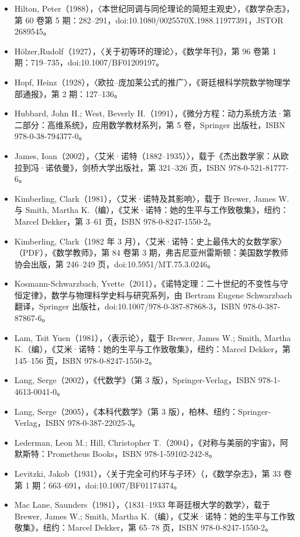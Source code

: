 \begin{itemize}
\item Hilton, Peter（1988），〈本世纪同调与同伦理论的简短主观史〉，《数学杂志》，第 60 卷第 5 期：282–291，doi:10.1080/0025570X.1988.11977391，JSTOR 2689545。
\item Hölzer,Rudolf（1927），〈关于初等环的理论〉，《数学年刊》，第 96 卷第 1 期：719–735，doi:10.1007/BF01209197。
\item Hopf, Heinz（1928），〈欧拉–庞加莱公式的推广〉，《哥廷根科学院数学物理学部通报》，第 2 期：127–136。
\item Hubbard, John H.; West, Beverly H.（1991），《微分方程：动力系统方法·第二部分：高维系统》，应用数学教材系列，第 5 卷，Springer 出版社，ISBN 978-0-38-794377-0。
\item James, Ioan（2002），〈艾米·诺特（1882–1935）〉，载于《杰出数学家：从欧拉到冯·诺依曼》，剑桥大学出版社，第 321–326 页，ISBN 978-0-521-81777-6。
\item Kimberling, Clark（1981），〈艾米·诺特及其影响〉，载于 Brewer, James W. 与 Smith, Martha K.（编），《艾米·诺特：她的生平与工作致敬集》，纽约：Marcel Dekker，第 3–61 页，ISBN 978-0-8247-1550-2。
\item Kimberling, Clark（1982 年 3 月），〈艾米·诺特：史上最伟大的女数学家〉（PDF），《数学教师》，第 84 卷第 3 期，弗吉尼亚州雷斯顿：美国数学教师协会出版，第 246–249 页，doi:10.5951/MT.75.3.0246。
\item Kosmann-Schwarzbach, Yvette（2011），《诺特定理：二十世纪的不变性与守恒定律》，数学与物理科学史料与研究系列，由 Bertram Eugene Schwarzbach 翻译，Springer 出版社，doi:10.1007/978-0-387-87868-3，ISBN 978-0-387-87867-6。
\item Lam, Tsit Yuen（1981），〈表示论〉，载于 Brewer, James W.; Smith, Martha K.（编），《艾米·诺特：她的生平与工作致敬集》，纽约：Marcel Dekker，第 145–156 页，ISBN 978-0-8247-1550-2。
\item Lang, Serge（2002），《代数学》（第 3 版），Springer-Verlag，ISBN 978-1-4613-0041-0。
\item Lang, Serge（2005），《本科代数学》（第 3 版），柏林、纽约：Springer-Verlag，ISBN 978-0-387-22025-3。
\item Lederman, Leon M.; Hill, Christopher T.（2004），《对称与美丽的宇宙》，阿默斯特：Prometheus Books，ISBN 978-1-59102-242-8。
\item Levitzki, Jakob（1931），〈关于完全可约环与子环〉（，《数学杂志》，第 33 卷第 1 期：663–691，doi:10.1007/BF01174374。
\item Mac Lane, Saunders（1981），〈1831–1933 年哥廷根大学的数学〉，载于 Brewer, James W.; Smith, Martha K.（编），《艾米·诺特：她的生平与工作致敬集》，纽约：Marcel Dekker，第 65–78 页，ISBN 978-0-8247-1550-2。

\end{itemize}
